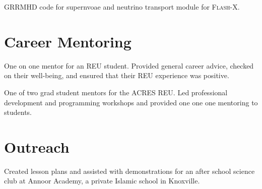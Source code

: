 \documentclass[letterpaper]{deedy-resume} %
\begin{document}
GRRMHD code for supernvoae and neutrino transport module for \textsc{Flash-X}.
\sectionspace %




\section{Career Mentoring}


One on one mentor for an REU student. Provided general career advice, checked on their well-being, and ensured that their REU experience was positive.
\sectionspace %



One of two grad student mentors for the ACRES REU. Led professional development and programming workshops and provided one one one mentoring to students.
\sectionspace %





\section{Outreach}


Created lesson plans and assisted with demonstrations for an after school science club at Annoor Academy, a private Islamic school in Knoxville.
\sectionspace %
\end{document}
